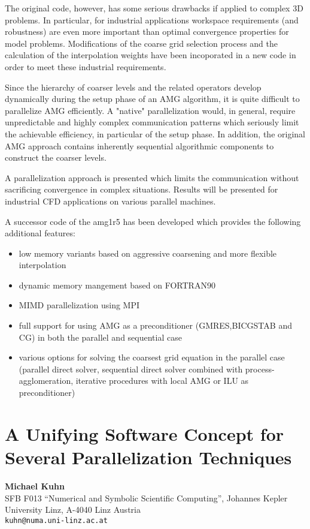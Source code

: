\documentclass[11pt]{article}
\newcommand{\nextab}[4]{
	\section{#2}
	{\bf #1} \\ \nopagebreak
	{#3} \\ \nopagebreak
	{\tt #4} \nopagebreak
	}
\begin{document}
The original code, however, has some serious drawbacks if applied to complex
3D problems. In particular, for industrial applications workspace requirements
(and robustness) are even more important than optimal convergence properties
for model problems.  Modifications of the coarse grid selection process and
the calculation of the interpolation weights have been incoporated in a new
code in order to meet these industrial requirements.

Since the hierarchy of coarser levels and the related operators develop
dynamically during the setup phase of an AMG algorithm, it is quite
difficult to parallelize AMG efficiently. A "native" parallelization
would, in general, require unpredictable and highly complex
communication patterns which seriously limit the achievable efficiency,
in particular of the setup phase. In addition, the original AMG approach
contains inherently sequential algorithmic components to construct the
coarser levels.

A parallelization approach is presented which limits the communication
without sacrificing convergence in complex situations. Results will be
presented for industrial CFD applications on various parallel machines.

A successor code of the amg1r5 has been developed which provides the
following additional features:
\begin{itemize}
\item
  low memory variants based on aggressive coarsening and more flexible
  interpolation
\item
  dynamic memory mangement based on FORTRAN90
\item
  MIMD parallelization using MPI
\item
  full support for using  AMG as a preconditioner (GMRES,BICGSTAB and CG)
  in both the parallel and sequential case
\item
  various options for solving the coarsest grid equation in the parallel
  case (parallel direct solver, sequential direct solver combined with
  process-agglomeration, iterative procedures with local AMG or
  ILU as preconditioner)
\end{itemize}


\nextab{Michael Kuhn}
	{A Unifying Software Concept for Several
		Parallelization Techniques}
	{SFB F013 ``Numerical and Symbolic Scientific Computing'',
	Johannes Kepler University Linz, A-4040 Linz Austria}
	{kuhn@numa.uni-linz.ac.at}
\end{document}
